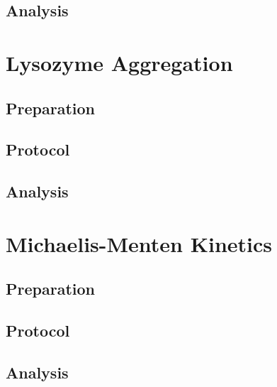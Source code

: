 \documentclass[a4paper,11pt]{article}
\begin{document}
        \subsection{Analysis}
            \lipsum[1]
    \pagebreak
    
    \section{Lysozyme Aggregation}
        \subsection{Preparation}
            \lipsum[1]
        \subsection{Protocol}
            \lipsum[1]
        \subsection{Analysis}
            \lipsum[1]
    \pagebreak
    
    \section{Michaelis-Menten Kinetics}
        \subsection{Preparation}
            \lipsum[1]
        \subsection{Protocol}
            \lipsum[1]
        \subsection{Analysis}
            \lipsum[1]
    \pagebreak
\end{document}
